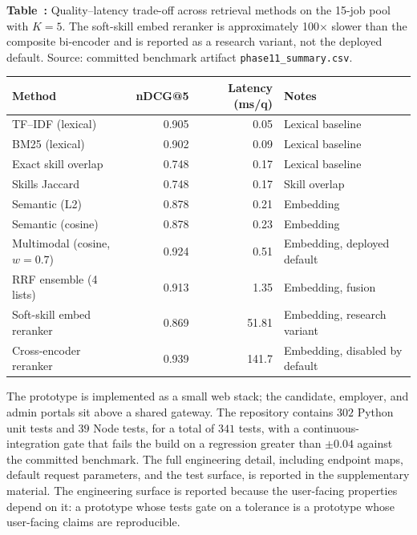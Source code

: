 \begin{center}
\label{tab:latency}
\par\smallskip\noindent\textbf{Table~\thetable:} Quality--latency trade-off across retrieval methods on the 15-job pool with $K = 5$. The soft-skill embed reranker is approximately 100$\times$ slower than the composite bi-encoder and is reported as a research variant, not the deployed default. Source: committed benchmark artifact \texttt{phase11\_summary.csv}.
\par\smallskip
\scriptsize
\setlength{\tabcolsep}{3pt}
\begin{tabular*}{\linewidth}{@{\extracolsep{\fill}}lrrl@{}}
\toprule
Method & nDCG@5 & Latency (ms/q) & Notes \\
\midrule
TF--IDF (lexical)         & 0.905 & 0.05  & Lexical baseline \\
BM25 (lexical)            & 0.902 & 0.09  & Lexical baseline \\
Exact skill overlap       & 0.748 & 0.17  & Lexical baseline \\
Skills Jaccard             & 0.748 & 0.17  & Skill overlap \\
Semantic (L2)              & 0.878 & 0.21  & Embedding \\
Semantic (cosine)          & 0.878 & 0.23  & Embedding \\
Multimodal (cosine, $w=0.7$) & 0.924 & 0.51  & Embedding, deployed default \\
RRF ensemble (4 lists)     & 0.913 & 1.35  & Embedding, fusion \\
Soft-skill embed reranker  & 0.869 & 51.81 & Embedding, research variant \\
Cross-encoder reranker     & 0.939 & 141.7 & Embedding, disabled by default \\
\bottomrule
\end{tabular*}
\par\vspace{0.4em}
\normalsize
\end{center}

The prototype is implemented as a small web stack; the candidate, employer, and admin portals sit above a shared gateway.
The repository contains $302$ Python unit tests and $39$ Node tests, for a total of $341$ tests, with a continuous-integration gate that fails the build on a \ndcg{} regression greater than $\pm 0.04$ against the committed benchmark.
The full engineering detail, including endpoint maps, default request parameters, and the test surface, is reported in the supplementary material.
The engineering surface is reported because the user-facing properties depend on it: a prototype whose tests gate on a \ndcg{} tolerance is a prototype whose user-facing claims are reproducible.
